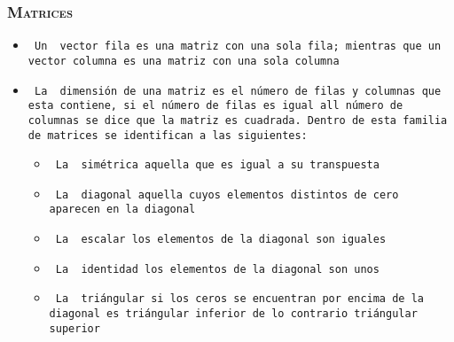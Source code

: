 \documentclass[16.5pt]{beamer}
\begin{document}
{
\begin{frame}
\frametitle{\textsc{\textbf{Matrices}}}
\hspace*{-5mm}
\vspace*{-5mm} 
\vspace{0.3cm}

\begin{itemize}
\item \texttt{ Un {\color{blue} vector fila} es una matriz con una sola fila; mientras que un {\color{blue} vector columna} es una matriz con una sola columna  }
\item \texttt{ La {\color{blue} dimensión} de una matriz es el número de filas y columnas que esta contiene, si el número de filas es igual all número de columnas se dice que la matriz es cuadrada. Dentro de esta familia de matrices se identifican a las siguientes:}
\begin{itemize}
\item \texttt{ La {\color{blue} simétrica} aquella que es igual a su transpuesta}
\item \texttt{ La {\color{blue} diagonal} aquella cuyos elementos distintos de cero aparecen en la diagonal}
\item \texttt{ La {\color{blue} escalar} los elementos de la diagonal son iguales}
\item \texttt{ La {\color{blue} identidad} los elementos de la diagonal son unos}
\item \texttt{ La {\color{blue} triángular} si los ceros se encuentran por encima de la diagonal es triángular inferior de lo contrario triángular superior}
\end{itemize}
\end{itemize}
\end{frame}

}
\end{document}
